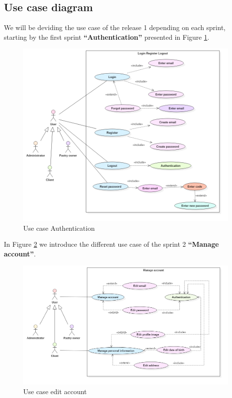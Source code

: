 \documentclass[12pt,a4paper]{report}
\begin{document}
\subsection{Use case diagram}
We will be deviding the use case of the release 1 depending on each sprint, starting by the first sprint \textbf{``Authentication''} presented in Figure \ref{auth-diag}.
\begin{figure}[H]
	\centering
	\includegraphics[width=6in,keepaspectratio]{auth.png}
	\caption{Use case Authentication}
	\label{auth-diag}
\end{figure}
\clearpage
In Figure \ref{edit-account} we introduce the different use case of the sprint 2 \textbf{``Manage account''}.
\begin{figure}[H]
	\vspace*{3cm}
	\centering
	\includegraphics[width=7.2in,keepaspectratio]{manageAccount.png}
	\caption{Use case edit account}
	\label{edit-account}
\end{figure}
\end{document}
